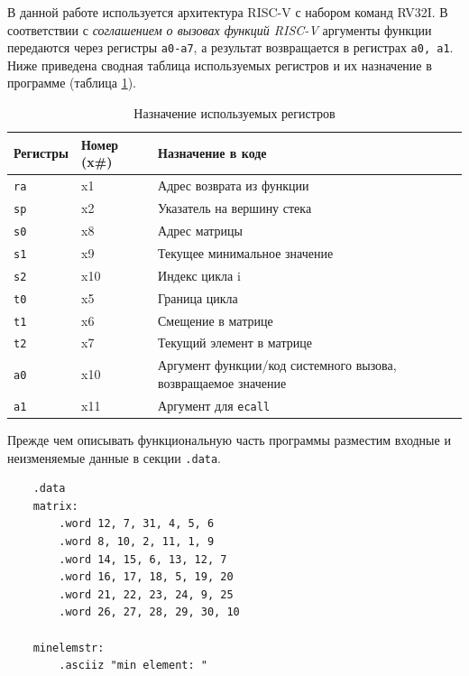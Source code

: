 \documentclass[14pt]{extarticle}
\begin{document}
В данной работе используется архитектура RISC-V с набором команд RV32I.
В соответствии с \textit{соглашением о вызовах функций RISC-V} аргументы функции передаются через регистры \texttt{a0-a7}, а результат возвращается в регистрах \texttt{a0, a1}.
Ниже приведена сводная таблица используемых регистров и их назначение в программе (таблица \ref{tab:regusage}).
\begin{table}[H]
\centering
\caption{Назначение используемых регистров}
\label{tab:regusage}
\small
\begin{tabularx}{\textwidth}{
|>{\centering\arraybackslash}X
|>{\centering\arraybackslash}X
|>{\centering\arraybackslash}X|}
\hline
\textbf{Регистры} & \textbf{Номер (x\#)} & \textbf{Назначение в коде} \\
\hline
\texttt{ra} & x1 & Адрес возврата из функции \\
\hline
\texttt{sp} & x2 & Указатель на вершину стека \\
\hline
\texttt{s0} & x8 & Адрес матрицы \\
\hline
\texttt{s1} & x9 & Текущее минимальное значение \\
\hline
\texttt{s2} & x10 & Индекс цикла i \\
\hline
\texttt{t0} & x5 & Граница цикла \\
\hline
\texttt{t1} & x6 & Смещение в матрице \\
\hline
\texttt{t2} & x7 & Текущий элемент в матрице \\
\hline
\texttt{a0} & x10 & Аргумент функции/код системного вызова, возвращаемое значение \\
\hline
\texttt{a1} & x11 & Аргумент для \texttt{ecall} \\
\hline
\end{tabularx}
\end{table}

\clearpage

Прежде чем описывать функциональную часть программы разместим входные и неизменяемые данные в секции \texttt{.data}.

\begin{listing}[H] 
    \begin{verbatim}
	.data
    matrix:
        .word 12, 7, 31, 4, 5, 6
        .word 8, 10, 2, 11, 1, 9
        .word 14, 15, 6, 13, 12, 7
        .word 16, 17, 18, 5, 19, 20
        .word 21, 22, 23, 24, 9, 25
        .word 26, 27, 28, 29, 30, 10

    minelemstr:
        .asciiz "min element: "
    \end{verbatim} 
\caption{Код программы на языке ассемблера RISC-V} 
\label{lst:asmcode_dataseg} 
\end{listing}
\end{document}
